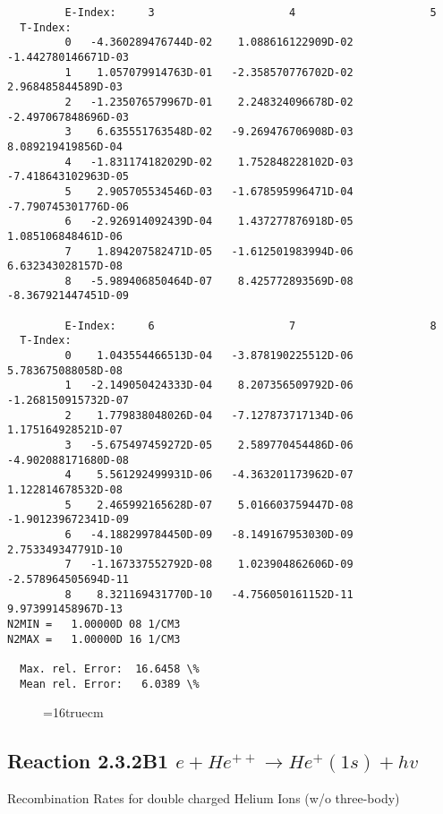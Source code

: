 \documentclass[12pt,dvipdfmx]{article}
\begin{document}
{\begin{small}
\begin{verbatim}
         E-Index:     3                     4                     5
  T-Index:
         0   -4.360289476744D-02    1.088616122909D-02   -1.442780146671D-03
         1    1.057079914763D-01   -2.358570776702D-02    2.968485844589D-03
         2   -1.235076579967D-01    2.248324096678D-02   -2.497067848696D-03
         3    6.635551763548D-02   -9.269476706908D-03    8.089219419856D-04
         4   -1.831174182029D-02    1.752848228102D-03   -7.418643102963D-05
         5    2.905705534546D-03   -1.678595996471D-04   -7.790745301776D-06
         6   -2.926914092439D-04    1.437277876918D-05    1.085106848461D-06
         7    1.894207582471D-05   -1.612501983994D-06    6.632343028157D-08
         8   -5.989406850464D-07    8.425772893569D-08   -8.367921447451D-09

         E-Index:     6                     7                     8
  T-Index:
         0    1.043554466513D-04   -3.878190225512D-06    5.783675088058D-08
         1   -2.149050424333D-04    8.207356509792D-06   -1.268150915732D-07
         2    1.779838048026D-04   -7.127873717134D-06    1.175164928521D-07
         3   -5.675497459272D-05    2.589770454486D-06   -4.902088171680D-08
         4    5.561292499931D-06   -4.363201173962D-07    1.122814678532D-08
         5    2.465992165628D-07    5.016603759447D-08   -1.901239672341D-09
         6   -4.188299784450D-09   -8.149167953030D-09    2.753349347791D-10
         7   -1.167337552792D-08    1.023904862606D-09   -2.578964505694D-11
         8    8.321169431770D-10   -4.756050161152D-11    9.973991458967D-13
N2MIN =   1.00000D 08 1/CM3
N2MAX =   1.00000D 16 1/CM3

  Max. rel. Error:  16.6458 \%
  Mean rel. Error:   6.0389 \%

\end{verbatim}\end{small}
\begin{figure} \label{2.3.2B0}
\epsfxsize=16truecm
\end{figure}
\newpage


\subsection{
Reaction 2.3.2B1  $e + He^{++} \rightarrow He^+(1s) + hv$
}
  Recombination Rates for double charged Helium Ions (w/o three-body)

}
\end{document}
